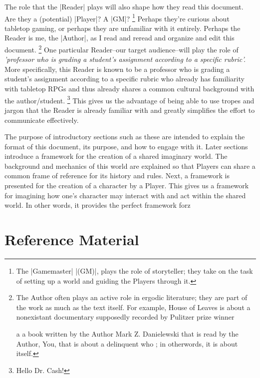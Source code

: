 \documentclass[letterpaper,twocolumn,openany,nodeprecatedcode]{dndbook}
\begin{document}
    The role that the |Reader| plays will also shape how they read this document. 
    Are they a (potential) |Player|? A |GM|?
        \footnote{The |Gamemaster|  |(GM)|, plays the role of storyteller; they take on the task of setting up a world and guiding the Players through it.} 
    Perhaps they're curious about tabletop gaming, or perhaps they are unfamiliar with it entirely. 
    Perhaps the Reader is me, the |Author|, as I read and reread and organize and edit this document.
        \footnote{The Author often plays an active role in ergodic literature; they are part of the work as much as the text itself.
        For example, \color{blue} House \color{black} of Leaves is about a nonexistant documentary supposedly recorded 
        by Pulitzer prize winner 
        
        a a book written by the Author Mark Z. Danielewski that is read by the Author, You, 
        that is about a delinquent who 
        ; in otherwords, it is about itself. }
    One particular Reader--our target audience--will play the role of \textit{'professor who is grading a student's assignment according to a specific rubric'.} 
    More specifically, this Reader is known to be a professor who is grading a student's assignment according to a specific rubric who already has familiarity 
    with tabletop RPGs and thus already shares a common cultural background with the author/student.
        \footnote{Hello Dr. Cash!} 
            This gives us the advantage of being able to use tropes and jargon that the Reader is already familiar with and greatly simplifies 
            the effort to communicate effectively.
    
    The purpose of introductory sections such as these are intended to explain the format of this document, its purpose, and how to engage with it. 
    Later sections introduce a framework for the creation of a shared imaginary world.  
    The background and mechanics of this world are explained so that Players can share a common frame of reference for its history and rules. 
    Next, a framework is presented for the creation of a character by a Player. 
    This gives us a framework for imagining how one's character may interact with and act within the shared world.
    In other words, it provides the perfect framework forz  

\chapter{Reference Material}
\end{document}
